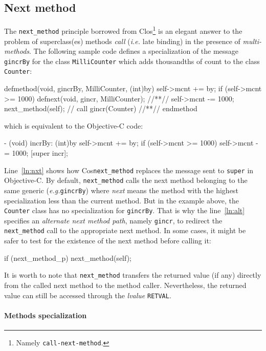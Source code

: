 \documentclass[preprint,10pt]{sigplanconf}
\newcommand{\abbrev}[1]{{\em #1}\xspace}
\newcommand{\ie}{\abbrev{i.e.}}
\newcommand{\eg}{\abbrev{e.g.}}
\newcommand{\ProgLang}[1]{{\sc #1}\xspace}
\newcommand{\Clos}      {\ProgLang{Clos}}
\newcommand{\Cos}       {\ProgLang{Cos}}
\newcommand{\Objc}      {\ProgLang{Objective-C}}
\newcommand{\code}[1]{\lstinline[language=COS,style=samplecode]|#1|}
\newcommand{\objcode}[1]{\lstinline[language=OBJC,style=samplecode]|#1|}
\newcommand{\closcode}[1]{\lstinline[language=CLOS,style=samplecode]|#1|}
\begin{document}
\subsection{Next method}

The \code{next_method} principle borrowed from \Clos\footnote{Namely \closcode{call-next-method}.} is an elegant answer to the problem of superclass(es) methods {\em call} (\ie late binding) in the presence of {\em multi-methods}. The following sample code defines a specialization of the message \code{gincrBy} for the class \code{MilliCounter} which adds thousandths of count to the class \code{Counter}:
\begin{COS}[left]
defmethod(void, gincrBy, MilliCounter, (int)by)
  self->mcnt += by;
  if (self->mcnt >= 1000) {
    defnext(void, gincr, MilliCounter); //*\label{ln:alt}*//
    self->mcnt -= 1000;
    next_method(self); // call gincr(Counter) //*\label{ln:nxt}*//
  }
endmethod
\end{COS}
which is equivalent to the \Objc code:
\begin{OBJC}
- (void) incrBy: (int)by {
  self->mcnt += by;
  if (self->mcnt >= 1000) {
    self->mcnt -= 1000;
    [super incr];
  }
}
\end{OBJC}
Line~\ref{ln:nxt} shows how \Cos \code{next_method} replaces the message sent to \objcode{super} in \Objc. By default, \code{next_method} calls the next method belonging to the same generic (\eg \code{gincrBy}) where {\em next} means the method with the highest specialization less than the current method. But in the example above, the \code{Counter} class has no specialization for \code{gincrBy}. That is why the line~\ref{ln:alt} specifies an {\em alternate next method path}, namely \code{gincr}, to redirect the \code{next_method} call to the appropriate next method. In some cases, it might be safer to test for the existence of the next method before calling it:
\begin{COS}
if (next_method_p) next_method(self);
\end{COS}
It is worth to note that \code{next_method} transfers the returned value (if any) directly from the called next method to the method caller. Nevertheless, the returned value can still be accessed through the {\em lvalue} \code{RETVAL}.

\paragraph{Methods specialization}
\end{document}
